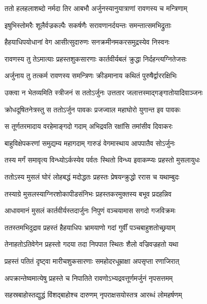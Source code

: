\twolineshloka
{ततो हलहलाशब्दो नर्मदा तिर आबभौ}
{अर्जुनस्यानुयात्राणां रावणस्य च मन्त्रिणाम्} %

\twolineshloka
{इषुभिस्तोमरैः शूलैर्वज्रकल्पैः सकर्षणैः}
{सरावणानर्दयन्तः समन्तात्समभिद्रुताः} %

\twolineshloka
{हैहयाधिपयोधानां वेग आसीत्सुदारुणः}
{सनक्रमीनमकरसमुद्रस्येव निस्वनः} %

\twolineshloka
{रावणस्य तु तेऽमात्याः प्रहस्तशुकसारणाः}
{कार्तवीर्यबलं क्रुद्धा निर्दहन्त्यग्नितेजसः} %

\twolineshloka
{अर्जुनाय तु तत्कर्म रावणस्य समन्त्रिणः}
{क्रीडमानाय कथितं पुरुषैर्द्वाररक्षिभिः} %

\twolineshloka
{उक्त्वा न भेतव्यमिति स्त्रीजनं स ततोऽर्जुनः}
{उत्ततार जलात्तस्माद्गङ्गातोयादिवाञ्जनः} %

\twolineshloka
{क्रोधदूषितनेत्रस्तु स ततोऽर्जुन पावकः}
{प्रजज्वाल महाघोरो युगान्त इव पावकः} %

\twolineshloka
{स तूर्णतरमादाय वरहेमाङ्गदो गदाम्}
{अभिद्रवति रक्षांसि तमांसीव दिवाकरः} %

\twolineshloka
{बाहुविक्षेपकरणां समुद्यम्य महागदाम्}
{गारुडं वेगमास्थाय आपपातैव सोऽर्जुनः} %

\twolineshloka
{तस्य मर्गं समावृत्य विन्ध्योऽर्कस्येव पर्वतः}
{स्थितो विन्ध्य इवाकम्प्यः प्रहस्तो मुसलायुधः} %

\twolineshloka
{ततोऽस्य मुसलं घोरं लोहबद्धं मदोद्धतः}
{प्रहस्तः प्रेषयन्क्रुद्धो ररास च यथाम्बुदः} %

\twolineshloka
{तस्याग्रे मुसलस्याग्निरशोकापीडसंनिभः}
{प्रहस्तकरमुक्तस्य बभूव प्रदहन्निव} %

\twolineshloka
{आधावमानं मुसलं कार्तवीर्यस्तदार्जुनः}
{निपुणं वञ्चयामास सगदो गजविक्रमः} %

\twolineshloka
{ततस्तमभिदुद्राव प्रहस्तं हैहयाधिपः}
{भ्रामयाणो गदां गुर्वीं पञ्चबाहुशतोच्छ्रयाम्} %

\twolineshloka
{तेनाहतोऽतिवेगेन प्रहस्तो गदया तदा}
{निपपात स्थितः शैलो वज्रिवज्रहतो यथा} %

\twolineshloka
{प्रहस्तं पतितं दृष्ट्वा मारीचशुकसारणाः}
{समहोदरधूम्राक्षा अपसृप्ता रणाजिरात्} %

\twolineshloka
{अपक्रान्तेष्वमात्येषु प्रहस्ते च निपातिते}
{रावणोऽभ्यद्रवत्तूर्णमर्जुनं नृपसत्तमम्} %

\twolineshloka
{सहस्रबाहोस्तद्युद्धं विंशद्बाहोश्च दारुणम्}
{नृपराक्षसयोस्तत्र आरब्धं लोमहर्षणम्} %


